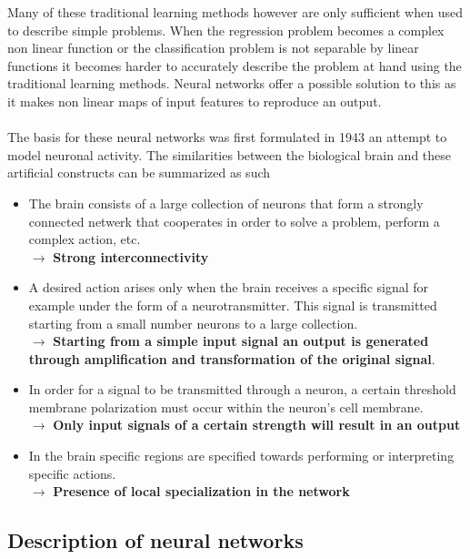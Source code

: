 \documentclass[12pt]{article}
\begin{document}
Many of these traditional learning methods however are only sufficient when used to describe simple problems. When the regression problem becomes a complex non linear function or the classification problem is not separable by linear functions it becomes harder to accurately describe the problem at hand using the traditional learning methods. Neural networks offer a possible solution to this as it makes non linear maps of input features to reproduce an output.
\\
\\
The basis for these neural networks was first formulated in 1943 an attempt to model neuronal activity\cite{McCullock, Wang2017}. The similarities between the biological brain and these artificial constructs can be summarized as such
\begin{itemize}
	\item The brain consists of a large collection of neurons that form a strongly connected netwerk that cooperates in order to solve a problem, perform a complex action, etc.\\$\rightarrow$ \textbf{Strong interconnectivity}
	\item A desired action arises only when the brain receives a specific signal for example under the form of a neurotransmitter. This signal is transmitted starting from a small number neurons to a large collection. \\$\rightarrow$ \textbf{Starting from a simple input signal an output is generated through amplification and transformation of the original signal}.
	\item In order for a signal to be transmitted through a neuron, a certain threshold membrane polarization must occur within the neuron's cell membrane. \\$\rightarrow$ \textbf{Only input signals of a certain strength will result in an output} 
	\item In the brain specific regions are specified towards performing or interpreting specific actions. \\$\rightarrow$ \textbf{Presence of local specialization in the network} 
\end{itemize}

\subsection{Description of neural networks}
\end{document}
